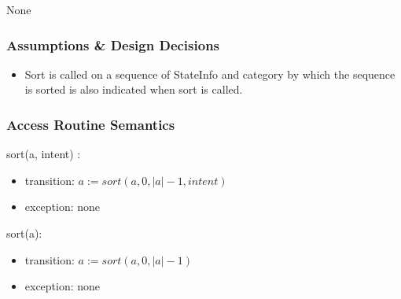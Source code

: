 \documentclass[12pt]{article}
\begin{document}
None

\subsubsection* {Assumptions \& Design Decisions}

\begin{itemize}
\item Sort is called on a sequence of StateInfo and category by which the sequence is sorted is also indicated when sort is called.
\end{itemize}

\subsubsection* {Access Routine Semantics}

\noindent sort(a, intent) :
\begin{itemize}
\item transition: $a := sort(a, 0, |a| - 1, intent)$
\item exception: none
\end{itemize}

\noindent sort(a):
\begin{itemize}
\item transition: $a := sort(a, 0, |a| - 1)$
\item exception: none
\end{itemize}
\end{document}
